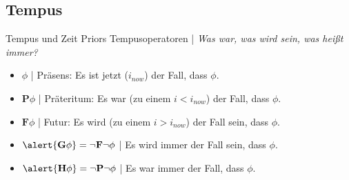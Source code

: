 

\subsection{Tempus}

\begin{frame}
  {Tempus und Zeit}
  \onslide<+->
  \onslide<+->
  Priors Tempusoperatoren | \textit{Was war, was wird sein, was heißt \alert{immer}?}\\
  \Zeile
  \begin{itemize}[<+->]
    \item \alert{$\phi$} | \alert{Präsens}: Es ist jetzt ($i_{now}$) der Fall, dass $\phi$.
    \item \alert{$\mathbf{P}\phi$} | \alert{Präteritum}: Es war (zu einem $i<i_{now}$) der Fall, dass $\phi$.
    \item \alert{$\mathbf{F}\phi$} | \alert{Futur}: Es wird (zu einem $i>i_{now}$) der Fall sein, dass $\phi$.
    \item $\alert{\mathbf{G}\phi} = \neg \mathbf{F}\neg \phi$ | Es wird immer der Fall sein, dass $\phi$.
    \item $\alert{\mathbf{H}\phi} = \neg \mathbf{P}\neg \phi$ | Es war immer der Fall, dass $\phi$.
  \end{itemize}
\end{frame}

